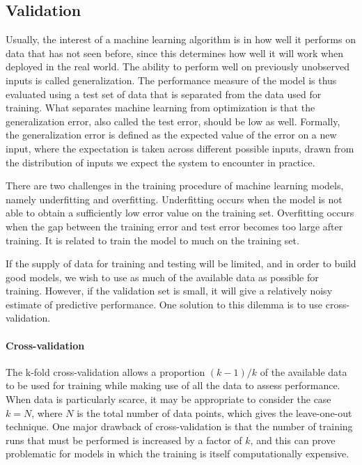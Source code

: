 \documentclass{scrartcl}
\begin{document}
\subsection{Validation}

Usually, the interest of a machine learning algorithm is in how well it performs on data that has not seen before, since this determines how well it will work when deployed in the real world. The ability to perform well on previously unobserved inputs is called generalization. The performance measure of the model is thus evaluated using a test set of data that is separated from the data used for training. What separates machine learning from optimization is that the generalization error, also called the test error, should be low as well. Formally, the generalization error is defined as the expected value of the error on a new input, where the expectation is taken across different possible inputs, drawn from the distribution of inputs we expect the system to encounter in practice.

There are two challenges in the training procedure of machine learning models, namely underfitting and overfitting. Underfitting occurs when the model is not able to obtain a sufficiently low error value on the training set. Overfitting occurs when the gap between the training error and test error becomes too large after training. It is related to train the model to much on the training set.

If the supply of data for training and testing will be limited, and in order to build good models, we wish to use as much of the available data as possible for training. However, if the validation set is small, it will give a relatively noisy estimate of predictive performance. One solution to this dilemma is to use cross-validation.

\paragraph{Cross-validation}  The k-fold cross-validation allows a proportion $(k-1)/k$ of the available data to be used for training while making use of all the data to assess performance. When data is particularly scarce, it may be appropriate to consider the case $k=N$, where $N$ is the total number of data points, which gives the leave-one-out technique. One major drawback of cross-validation is that the number of training runs that must be performed is increased by a factor of $k$, and this can prove problematic for models in which the training is itself computationally expensive.
\end{document}
